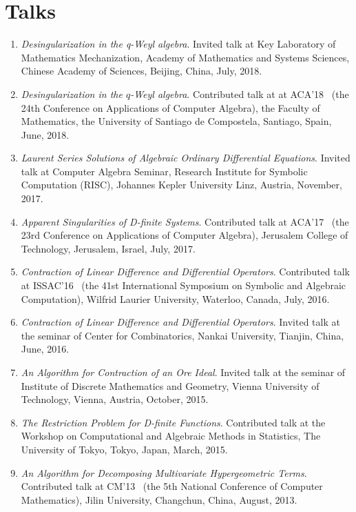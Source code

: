 \documentclass[a4paper,12pt]{article}
\begin{document}
\section*{\Large{Talks}}
\begin{enumerate}
 \item {\em Desingularization in the q-Weyl algebra}. 
 Invited talk at Key Laboratory of Mathematics Mechanization, Academy of Mathematics and Systems Sciences,
 Chinese Academy of Sciences, Beijing, China, July, 2018. 
 \item {\em Desingularization in the $q$-Weyl algebra}. 
 Contributed talk at at ACA'18 
 \ (the 24th Conference on Applications of Computer Algebra), the Faculty of Mathematics, 
 the University of Santiago de Compostela, Santiago, Spain, June, 2018.
 \item {\em Laurent Series Solutions of Algebraic Ordinary Differential Equations}. 
 Invited talk at Computer Algebra Seminar, Research Institute for Symbolic Computation (RISC), Johannes Kepler University Linz, 
 Austria, November, 2017.
 \item {\em Apparent Singularities of D-finite Systems}. Contributed talk at ACA'17 
 \ (the 23rd Conference on Applications of Computer Algebra), Jerusalem College of Technology, Jerusalem, Israel, July, 2017.
 \item {\em Contraction of Linear Difference and Differential Operators}. Contributed talk at ISSAC'16 
 \ (the 41st International Symposium on Symbolic and Algebraic Computation), Wilfrid Laurier University, Waterloo, Canada, July, 2016.
 \item {\em Contraction of Linear Difference and Differential Operators}.
       Invited talk at the seminar of Center for Combinatorics, Nankai University, Tianjin, China, June, 2016.
 \item {\em An Algorithm for Contraction of an Ore Ideal}. Invited talk at the seminar of Institute of Discrete Mathematics and Geometry, 
       Vienna University of Technology, Vienna, Austria, October, 2015.
 \item {\em The Restriction Problem for D-finite Functions}. 
       Contributed talk at the Workshop on Computational and Algebraic Methods in Statistics,
       The University of Tokyo, Tokyo, Japan, March, 2015.
 \item {\em An Algorithm for Decomposing Multivariate Hypergeometric Terms}. Contributed talk at CM'13
       \ (the 5th National Conference of Computer Mathematics), Jilin University, Changchun, China, August, 2013.
\end{enumerate}
\end{document}
